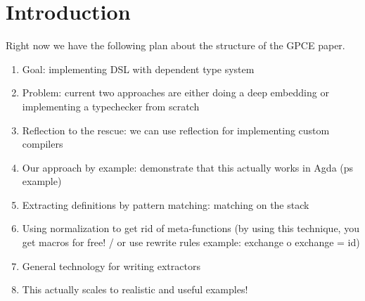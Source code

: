 \documentclass[sigplan,anonymous,review]{acmart}
\begin{document}
\begin{abstract}
%
\end{abstract}
\maketitle

\section{Introduction}
Right now we have the following plan about the structure of the GPCE paper.
\begin{enumerate}
    \item Goal: implementing DSL with dependent type system
    \item Problem: current two approaches are either doing a deep embedding or
        implementing a typechecker from scratch
    \item Reflection to the rescue: we can use reflection for implementing
        custom compilers
    \item Our approach by example: demonstrate that this actually works in Agda
        (ps example)
    \item Extracting definitions by pattern matching: matching on the stack
    \item Using normalization to get rid of meta-functions (by using this
        technique, you get macros for free! / or use rewrite rules example:
        exchange o exchange = id)
    \item General technology for writing extractors
    \item This actually scales to realistic and useful examples!
\end{enumerate}
\end{document}
